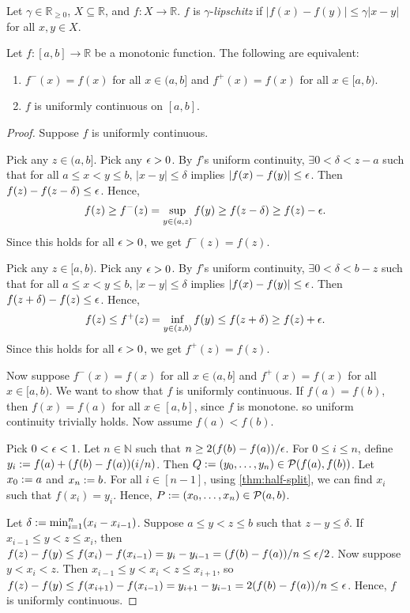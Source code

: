 \documentclass[a4paper,12pt,fleqn]{article}
\begin{document}
\begin{definition}
\label{defn:lipschitz}
Let $\gamma \in \mathbb{R}_{\ge 0}$, $X \subseteq \mathbb{R}$, and $f: X \to \mathbb{R}$.
$f$ is $\gamma$-\emph{lipschitz} if
$|f(x) - f(y)| \le \gamma|x - y|$ for all $x, y \in X$.
\end{definition}

\begin{lemma}
\label{thm:monotone-ucont-iff-cont}
Let $f: [a, b] \to \mathbb{R}$ be a monotonic function.
The following are equivalent:
\begin{enumerate}
\item $f^-(x) = f(x)$ for all $x \in (a, b]$ and $f^+(x) = f(x)$ for all $x \in [a, b)$.
\item $f$ is uniformly continuous on $[a, b]$.
\end{enumerate}
\end{lemma}
\begin{proof}
Suppose $f$ is uniformly continuous.

Pick any $z \in (a, b]$. Pick any $\epsilon > 0$.
By $f$'s uniform continuity, $\exists 0 < \delta < z-a$ such that
for all $a \le x < y \le b$, $|x-y| \le \delta$ implies $|f(x)-f(y)| \le \epsilon$.
Then $f(z) - f(z-\delta) \le \epsilon$. Hence,
\[ f(z) \ge f^-(z) = \sup_{y \in (a, z)} f(y) \ge f(z-\delta) \ge f(z) - \epsilon. \]
Since this holds for all $\epsilon > 0$, we get $f^-(z) = f(z)$.

Pick any $z \in [a, b)$. Pick any $\epsilon > 0$.
By $f$'s uniform continuity, $\exists 0 < \delta < b-z$ such that
for all $a \le x < y \le b$, $|x-y| \le \delta$ implies $|f(x)-f(y)| \le \epsilon$.
Then $f(z+\delta) - f(z) \le \epsilon$. Hence,
\[ f(z) \le f^+(z) = \inf_{y \in (z, b)} f(y) \le f(z+\delta) \ge f(z) + \epsilon. \]
Since this holds for all $\epsilon > 0$, we get $f^+(z) = f(z)$.

Now suppose $f^-(x) = f(x)$ for all $x \in (a, b]$ and $f^+(x) = f(x)$ for all $x \in [a, b)$.
We want to show that $f$ is uniformly continuous.
If $f(a) = f(b)$, then $f(x) = f(a)$ for all $x \in [a, b]$, since $f$ is monotone.
so uniform continuity trivially holds. Now assume $f(a) < f(b)$.

Pick $0 < \epsilon < 1$. Let $n \in \mathbb{N}$ such that $n \ge 2(f(b)-f(a))/\epsilon$.
For $0 \le i \le n$, define $y_i := f(a) + (f(b)-f(a))(i/n)$.
Then $Q := (y_0, \ldots, y_n) \in \mathcal{P}(f(a), f(b))$.
Let $x_0 := a$ and $x_n := b$.
For all $i \in [n-1]$, using \cref{thm:half-split},
we can find $x_i$ such that $f(x_i) = y_i$.
Hence, $P := (x_0, \ldots, x_n) \in \mathcal{P}(a, b)$.

Let $\delta := \min_{i=1}^n (x_i - x_{i-1})$.
Suppose $a \le y < z \le b$ such that $z - y \le \delta$.
If $x_{i-1} \le y < z \le x_i$, then
$f(z) - f(y) \le f(x_i) - f(x_{i-1}) = y_i - y_{i-1} = (f(b)-f(a))/n \le \epsilon/2$.
Now suppose $y < x_i < z$. Then $x_{i-1} \le y < x_i < z \le x_{i+1}$, so
$f(z) - f(y) \le f(x_{i+1}) - f(x_{i-1}) = y_{i+1} - y_{i-1} = 2(f(b)-f(a))/n \le \epsilon$.
Hence, $f$ is uniformly continuous.
\end{proof}
\end{document}
